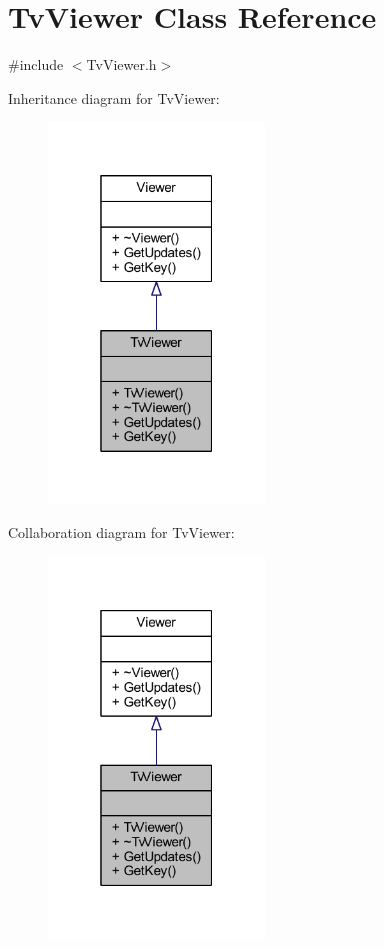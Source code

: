 \hypertarget{class_tv_viewer}{}\section{Tv\+Viewer Class Reference}
\label{class_tv_viewer}


{\ttfamily \#include $<$Tv\+Viewer.\+h$>$}



Inheritance diagram for Tv\+Viewer\+:
\nopagebreak
\begin{figure}[H]
\begin{center}
\leavevmode
\includegraphics[width=163pt]{class_tv_viewer__inherit__graph}
\end{center}
\end{figure}


Collaboration diagram for Tv\+Viewer\+:
\nopagebreak
\begin{figure}[H]
\begin{center}
\leavevmode
\includegraphics[width=163pt]{class_tv_viewer__coll__graph}
\end{center}
\end{figure}
